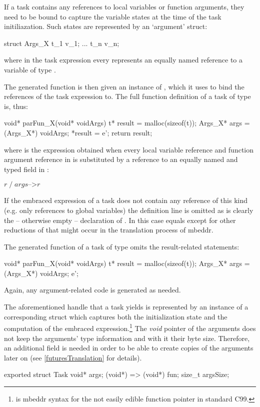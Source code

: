 If a task contains any references to local variables or function arguments, they need to be bound to capture the variable states at the time of the task initiliazation. Such states are represented by an `argument' struct:

\begin{ccode}
struct Args_X {
  t_1 v_1;
  ...
  t_n v_n;
}
\end{ccode}

where in the task expression every  represents an equally named reference to a variable of type .

The generated function  is then given an instance of , which it uses to bind the references of the task expression to. The full function definition of a task  of type  is, thus:

\begin{ccode}
void* parFun_X(void* voidArgs) {
  t* result = malloc(sizeof(t));
  Args_X* args = (Args_X*) voidArgs;
  *result = e';
  return result;
}
\end{ccode}

where  is the expression obtained when every local variable reference and function argument reference  in  is substituted by a reference to an equally named and typed field in :

$r\;/\;args\text{-->}r$

If the embraced expression of a task does not contain any reference of this kind (e.g. only references to global variables) the  definition line is omitted as is clearly the -- otherwise empty -- declaration of . In this case  equals  except for other reductions of  that might occur in the translation process of mbeddr.

The generated function of a task of type  omits the result-related statements:

\begin{ccode}
void* parFun_X(void* voidArgs) {
  t* result = malloc(sizeof(t));
  Args_X* args = (Args_X*) voidArgs;
  e';
}
\end{ccode}

Again, any argument-related code is generated as needed.

The aforementioned handle that a task yields is represented by an instance of a corresponding struct which captures both the initialization state and the computation of the embraced expression.\footnote{ is mbeddr syntax for the not easily edible function pointer  in standard C99.} The \textit{void} pointer of the arguments  does not keep the arguments' type information and with it their byte size. Therefore, an additional field  is needed in order to be able to create copies of the arguments later on (see \ref{futuresTranslation} for details).
\begin{ccode}
exported struct Task {
  void* args;
  (void*) => (void*) fun;
  size_t argsSize;
}
\end{ccode}


